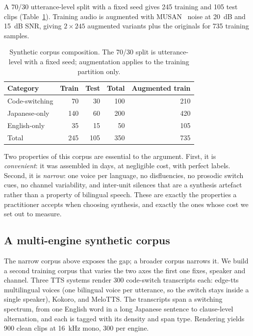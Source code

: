 \documentclass[11pt,a4paper]{article}
\begin{document}
A 70/30 utterance-level split with a fixed seed gives 245 training and 105 test
clips (Table~\ref{tab:corpus}). Training audio is augmented with
MUSAN~\cite{snyder2015musan} noise at \SI{20}{\deci\bel} and \SI{15}{\deci\bel}
SNR, giving $2 \times 245$ augmented variants plus the originals for 735 training
samples.

\begin{table}[t]
\centering
\caption{Synthetic corpus composition. The 70/30 split is utterance-level with a
fixed seed; augmentation applies to the training partition only.}
\label{tab:corpus}
\small
\begin{tabular}{lrrrr}
\toprule
Category & Train & Test & Total & Augmented train \\
\midrule
Code-switching  &  70 &  30 & 100 & 210 \\
Japanese-only   & 140 &  60 & 200 & 420 \\
English-only    &  35 &  15 &  50 & 105 \\
\midrule
Total           & 245 & 105 & 350 & 735 \\
\bottomrule
\end{tabular}
\end{table}

Two properties of this corpus are essential to the argument. First, it is
\emph{convenient}: it was assembled in days, at negligible cost, with perfect
labels. Second, it is \emph{narrow}: one voice per language, no disfluencies, no
prosodic switch cues, no channel variability, and inter-unit silences that are a
synthesis artefact rather than a property of bilingual speech. These are exactly
the properties a practitioner accepts when choosing synthesis, and exactly the
ones whose cost we set out to measure.

\subsection{A multi-engine synthetic corpus}
\label{sec:multiengine}

The narrow corpus above exposes the gap; a broader corpus narrows it. We build a
second training corpus that varies the two axes the first one fixes, speaker and
channel. Three TTS systems render 300 code-switch transcripts each: edge-tts
multilingual voices (one bilingual voice per utterance, so the switch stays inside a
single speaker), Kokoro, and MeloTTS. The transcripts span a switching spectrum,
from one English word in a long Japanese sentence to clause-level alternation, and
each is tagged with its density and span type. Rendering yields 900 clean clips at
\SI{16}{\kilo\hertz} mono, 300 per engine.
\end{document}
